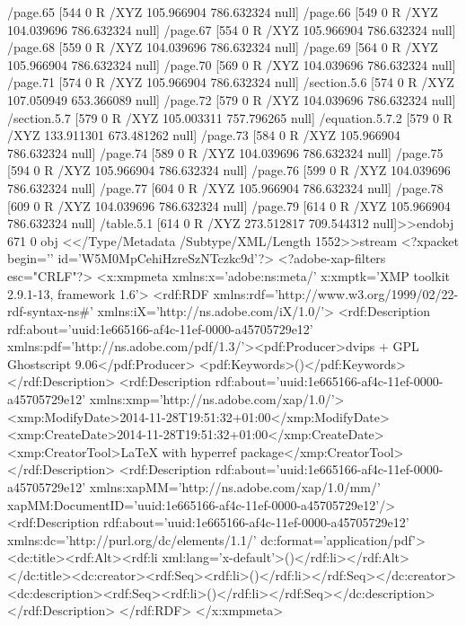 {{{{{{{/page.65 [544 0 R /XYZ 105.966904 786.632324 null]
/page.66 [549 0 R /XYZ 104.039696 786.632324 null]
/page.67 [554 0 R /XYZ 105.966904 786.632324 null]
/page.68 [559 0 R /XYZ 104.039696 786.632324 null]
/page.69 [564 0 R /XYZ 105.966904 786.632324 null]
/page.70 [569 0 R /XYZ 104.039696 786.632324 null]
/page.71 [574 0 R /XYZ 105.966904 786.632324 null]
/section.5.6 [574 0 R /XYZ 107.050949 653.366089 null]
/page.72 [579 0 R /XYZ 104.039696 786.632324 null]
/section.5.7 [579 0 R /XYZ 105.003311 757.796265 null]
/equation.5.7.2 [579 0 R /XYZ 133.911301 673.481262 null]
/page.73 [584 0 R /XYZ 105.966904 786.632324 null]
/page.74 [589 0 R /XYZ 104.039696 786.632324 null]
/page.75 [594 0 R /XYZ 105.966904 786.632324 null]
/page.76 [599 0 R /XYZ 104.039696 786.632324 null]
/page.77 [604 0 R /XYZ 105.966904 786.632324 null]
/page.78 [609 0 R /XYZ 104.039696 786.632324 null]
/page.79 [614 0 R /XYZ 105.966904 786.632324 null]
/table.5.1 [614 0 R /XYZ 273.512817 709.544312 null]>>endobj
671 0 obj
<</Type/Metadata
/Subtype/XML/Length 1552>>stream
<?xpacket begin='﻿' id='W5M0MpCehiHzreSzNTczkc9d'?>
<?adobe-xap-filters esc="CRLF"?>
<x:xmpmeta xmlns:x='adobe:ns:meta/' x:xmptk='XMP toolkit 2.9.1-13, framework 1.6'>
<rdf:RDF xmlns:rdf='http://www.w3.org/1999/02/22-rdf-syntax-ns#' xmlns:iX='http://ns.adobe.com/iX/1.0/'>
<rdf:Description rdf:about='uuid:1e665166-af4c-11ef-0000-a45705729e12' xmlns:pdf='http://ns.adobe.com/pdf/1.3/'><pdf:Producer>dvips + GPL Ghostscript 9.06</pdf:Producer>
<pdf:Keywords>()</pdf:Keywords>
</rdf:Description>
<rdf:Description rdf:about='uuid:1e665166-af4c-11ef-0000-a45705729e12' xmlns:xmp='http://ns.adobe.com/xap/1.0/'><xmp:ModifyDate>2014-11-28T19:51:32+01:00</xmp:ModifyDate>
<xmp:CreateDate>2014-11-28T19:51:32+01:00</xmp:CreateDate>
<xmp:CreatorTool>LaTeX with hyperref package</xmp:CreatorTool></rdf:Description>
<rdf:Description rdf:about='uuid:1e665166-af4c-11ef-0000-a45705729e12' xmlns:xapMM='http://ns.adobe.com/xap/1.0/mm/' xapMM:DocumentID='uuid:1e665166-af4c-11ef-0000-a45705729e12'/>
<rdf:Description rdf:about='uuid:1e665166-af4c-11ef-0000-a45705729e12' xmlns:dc='http://purl.org/dc/elements/1.1/' dc:format='application/pdf'><dc:title><rdf:Alt><rdf:li xml:lang='x-default'>()</rdf:li></rdf:Alt></dc:title><dc:creator><rdf:Seq><rdf:li>()</rdf:li></rdf:Seq></dc:creator><dc:description><rdf:Seq><rdf:li>()</rdf:li></rdf:Seq></dc:description></rdf:Description>
</rdf:RDF>
</x:xmpmeta>
                                                                        
}}}}}}}
